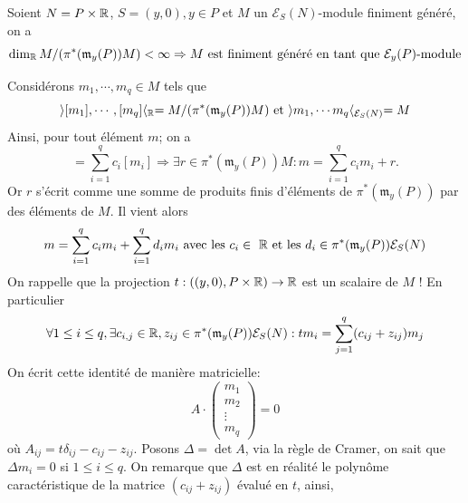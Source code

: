 \documentclass[memoire.tex]{subfiles}
\begin{document}
\begin{lemme}
    Soient $N=P\times \mathbb{R}$, $S=(y,0),y\in P$ et $M$ un $\mathcal{E}_S(N)$-module finiment généré, on a 
\begin{equation*}
    \dim_{\mathbb{R}} M/(\pi^{*}(\mathfrak{m}_y(P))M)< 
    \infty\Rightarrow M \text{ est finiment généré en tant que $\mathcal{E}_y(P)$-module}
\end{equation*}
\end{lemme}
\begin{preuve}
    Considérons $m_1,\cdots,m_q\in M$ tels que 
    \begin{equation*}
    \rangle [m_1],\cdots,[m_q] \langle_{\mathbb{R}}= M/(\pi^{*}(\mathfrak{m}_y(P))M)\text{ et } \rangle m_1,\cdots m_q \langle_{\mathcal{E}_S(N)}=M
    \end{equation*}
    Ainsi, pour tout élément $m$; on a 
    \begin{equation*}
        [m]=\sum_{i=1}^{q}c_i [m_i]\Rightarrow \exists r\in \pi^{*}(\mathfrak{m}_y(P))M : m=\sum_{i=1}^q c_im_i+r.
    \end{equation*}
    Or $r$ s'écrit comme une somme de produits finis d'éléments de $\pi^{*}(\mathfrak{m}_y(P))$ par des éléments de $M$. Il vient alors
    \begin{equation*}
        m=\sum_{i=1}^{q} c_i m_i +\sum_{i=1}^{q} d_i m_i\text{ avec les $c_i\in\ \mathbb{R} $ et les $d_i\in\pi^{*}(\mathfrak{m}_y(P))\mathcal{E}_S(N)$}
    \end{equation*}
    On rappelle que la projection $t: ((y,0),P\times \mathbb{R})\rightarrow \mathbb{R}$ est un scalaire de $M$ ! En particulier 
    \begin{equation*}
        \forall 1\leq i\leq q,\exists c_{i,j}\in \mathbb{R},z_{ij}\in\pi^{*}(\mathfrak{m}_y(P))\mathcal{E}_S(N): tm_i=\sum_{j=1}^q (c_{ij}+z_{ij})m_j
    \end{equation*}
    On écrit cette identité de manière matricielle:
    \begin{equation}\label{equationMatrice1}
        A\cdot \begin{pmatrix}
           m_{1} \\
           m_{2} \\
           \vdots \\
           m_{q}
         \end{pmatrix}
         =0
    \end{equation}
    où $A_{ij}=t\delta_{ij}-c_{ij}-z_{ij}$. Posons $\Delta=\det A$, via la règle de Cramer, on sait que $\Delta m_i=0$ si $1\leq i\leq q$. On remarque que $\Delta$ est en réalité le polynôme caractéristique de la matrice $(c_{ij}+z_{ij})$ évalué en $t$, ainsi, 

\end{preuve}
\end{document}
